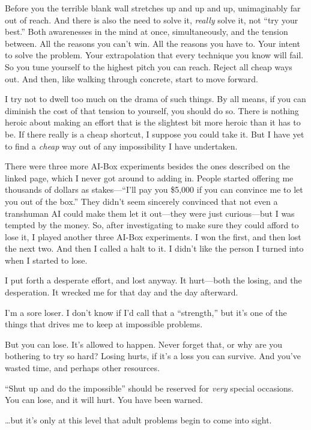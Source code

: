{
 Before you the terrible blank wall stretches up and up and up,
unimaginably far out of reach. And there is also the need to solve it,
\textit{really} solve it, not ``try your
best.'' Both awarenesses in the mind at once,
simultaneously, and the tension between. All the reasons you
can't win. All the reasons you have to. Your intent to
solve the problem. Your extrapolation that every technique you know
will fail. So you tune yourself to the highest pitch you can reach.
Reject all cheap ways out. And then, like walking through concrete,
start to move forward.}

{
 I try not to dwell too much on the drama of such things. By all
means, if you can diminish the cost of that tension to yourself, you
should do so. There is nothing heroic about making an effort that is
the slightest bit more heroic than it has to be. If there really is a
cheap shortcut, I suppose you could take it. But I have yet to find a
\textit{cheap} way out of any impossibility I have undertaken.}

{
 There were three more AI-Box experiments besides the ones
described on the linked page, which I never got around to adding in.
People started offering me thousands of dollars as
stakes---``I'll pay you \$5,000 if you
can convince me to let you out of the box.'' They
didn't seem sincerely convinced that not even a
transhuman AI could make them let it out---they were just curious---but
I was tempted by the money. So, after investigating to make sure they
could afford to lose it, I played another three AI-Box experiments. I
won the first, and then lost the next two. And then I called a halt to
it. I didn't like the person I turned into when I
started to lose.}

{
 I put forth a desperate effort, and lost anyway. It hurt---both
the losing, and the desperation. It wrecked me for that day and the day
afterward.}

{
 I'm a sore loser. I don't know if
I'd call that a
``strength,'' but
it's one of the things that drives me to keep at
impossible problems.}

{
 But you can lose. It's allowed to happen. Never
forget that, or why are you bothering to try so hard? Losing hurts, if
it's a loss you can survive. And you've
wasted time, and perhaps other resources.}

{
 ``Shut up and do the
impossible'' should be reserved for \textit{very}
special occasions. You can lose, and it will hurt. You have been
warned.}

{
 \ldots but it's only at this level that adult
problems begin to come into sight.}

